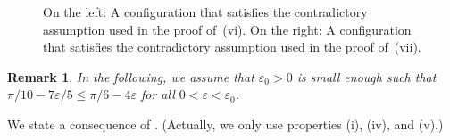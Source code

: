 \documentclass[reqno]{amsart}
\newcommand{\eps}{\varepsilon}
\theoremstyle{plain}
\newtheorem{remark}[theorem]{Remark}
\theoremstyle{definition}
\numberwithin{equation}{section}
\begin{document}
\begin{figure}[htp]
\caption{On the left: A configuration that satisfies the contradictory assumption used in the proof of~(vi).  On the right: A configuration that satisfies the contradictory assumption used in the proof of~(vii).}
\label{Fig:Lem3.5(vi)}
\end{figure}
 

\begin{remark}\label{rem: eps}
In the following, we assume that $\varepsilon_0>0$ is small enough such that $ \pi/10 - 7\varepsilon/5  \leq  \pi/6-  4\varepsilon$ for all $0  < \eps < \eps_0$.  
\end{remark}

 We state a consequence of . (Actually, we only use properties (i), (iv), and (v).)
\end{document}
